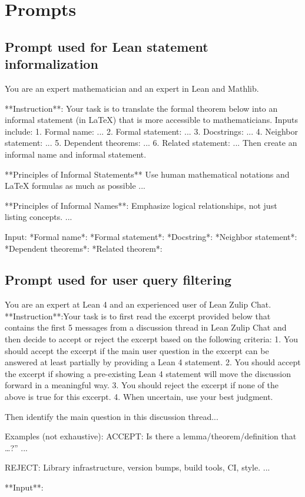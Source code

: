 \documentclass{article} %
\begin{document}
\section{Prompts}
\label{prompts}

\subsection{Prompt used for Lean statement informalization}
\label{sec:informalization_prompt}

\begin{promptbox}
You are an expert mathematician and an expert in Lean and Mathlib.

**Instruction**: Your task is to translate the formal theorem below
into an informal statement (in LaTeX) that is more accessible to mathematicians.
Inputs include:
1. Formal name: ...
2. Formal statement: ...
3. Docstrings: ...
4. Neighbor statement: ...
5. Dependent theorems: ...
6. Related statement: ...
Then create an informal name and informal statement.

**Principles of Informal Statements**
Use human mathematical notations and LaTeX formulas as much as possible
...

**Principles of Informal Names**:
Emphasize logical relationships, not just listing concepts.
...

Input:
*Formal name*:
*Formal statement*:
*Docstring*:
*Neighbor statement*:
*Dependent theorems*:
*Related theorem*:
\end{promptbox}



\subsection{Prompt used for user query filtering}
\label{sec:filtering_prompt}

\begin{promptbox}
You are an expert at Lean 4 and an experienced user of Lean Zulip Chat.
**Instruction**:Your task is to first read the excerpt provided below that contains the first 5 messages from a discussion thread in Lean Zulip Chat and then decide to accept or reject the excerpt based on the following criteria:
1. You should accept the excerpt if the main user question in the excerpt can be answered at least partially by providing a Lean 4 statement.
2. You should accept the excerpt if showing a pre-existing Lean 4 statement will move the discussion forward in a meaningful way.
3. You should reject the excerpt if none of the above is true for this excerpt.
4. When uncertain, use your best judgment.

Then identify the main question in this discussion thread...

Examples (not exhaustive):
ACCEPT: Is there a lemma/theorem/definition that …?”
...

REJECT: Library infrastructure, version bumps, build tools, CI, style.
...

**Input**:
\end{promptbox}
\end{document}

